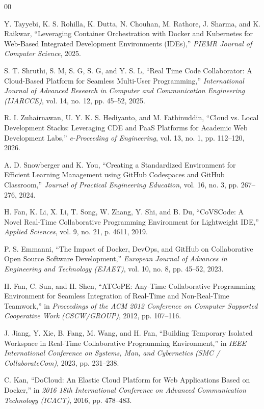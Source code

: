\documentclass[conference]{IEEEtran}
\begin{document}
\begin{thebibliography}{00}

Y. Tayyebi, K. S. Rohilla, K. Dutta, N. Chouhan, M. Rathore, J. Sharma, and K. Raikwar, ``Leveraging Container Orchestration with Docker and Kubernetes for Web-Based Integrated Development Environments (IDEs),'' \textit{PIEMR Journal of Computer Science}, 2025.

S. T. Shruthi, S. M, S. G, S. G, and Y. S. L, ``Real Time Code Collaborator: A Cloud-Based Platform for Seamless Multi-User Programming,'' \textit{International Journal of Advanced Research in Computer and Communication Engineering (IJARCCE)}, vol. 14, no. 12, pp. 45--52, 2025.

R. I. Zuhairnawan, U. Y. K. S. Hediyanto, and M. Fathinuddin, ``Cloud vs. Local Development Stacks: Leveraging CDE and PaaS Platforms for Academic Web Development Labs,'' \textit{e-Proceeding of Engineering}, vol. 13, no. 1, pp. 112--120, 2026.

A. D. Snowberger and K. You, ``Creating a Standardized Environment for Efficient Learning Management using GitHub Codespaces and GitHub Classroom,'' \textit{Journal of Practical Engineering Education}, vol. 16, no. 3, pp. 267--276, 2024.

H. Fan, K. Li, X. Li, T. Song, W. Zhang, Y. Shi, and B. Du, ``CoVSCode: A Novel Real-Time Collaborative Programming Environment for Lightweight IDE,'' \textit{Applied Sciences}, vol. 9, no. 21, p. 4611, 2019.

P. S. Emmanni, ``The Impact of Docker, DevOps, and GitHub on Collaborative Open Source Software Development,'' \textit{European Journal of Advances in Engineering and Technology (EJAET)}, vol. 10, no. 8, pp. 45--52, 2023.

H. Fan, C. Sun, and H. Shen, ``ATCoPE: Any-Time Collaborative Programming Environment for Seamless Integration of Real-Time and Non-Real-Time Teamwork,'' in \textit{Proceedings of the ACM 2012 Conference on Computer Supported Cooperative Work (CSCW/GROUP)}, 2012, pp. 107--116.

J. Jiang, Y. Xie, B. Fang, M. Wang, and H. Fan, ``Building Temporary Isolated Workspace in Real-Time Collaborative Programming Environment,'' in \textit{IEEE International Conference on Systems, Man, and Cybernetics (SMC / CollaborateCom)}, 2023, pp. 231--238.

C. Kan, ``DoCloud: An Elastic Cloud Platform for Web Applications Based on Docker,'' in \textit{2016 18th International Conference on Advanced Communication Technology (ICACT)}, 2016, pp. 478--483.


\end{thebibliography}
\end{document}
